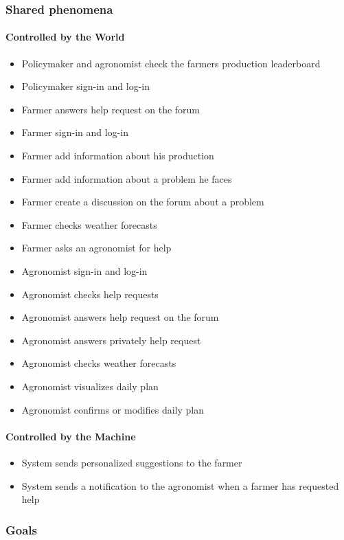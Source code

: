 \subsubsection{Shared phenomena}
\paragraph{Controlled by the World}
\begin{itemize}
    \item Policymaker and agronomist check the farmers production leaderboard
    \item Policymaker sign-in and log-in
    \item Farmer answers help request on the forum
    \item Farmer sign-in and log-in 
    \item Farmer add information about his production
    \item Farmer add information about a problem he faces
    \item Farmer create a discussion on the forum about a problem
    \item Farmer checks weather forecasts
    \item Farmer asks an agronomist for help
    \item Agronomist sign-in and log-in
    \item Agronomist checks help requests
    \item Agronomist answers help request on the forum
    \item Agronomist answers privately help request
    \item Agronomist checks weather forecasts
    \item Agronomist visualizes daily plan
    \item Agronomist confirms or modifies daily plan
\end{itemize}

\paragraph{Controlled by the Machine}
\begin{itemize}
    \item System sends personalized suggestions to the farmer
    \item System sends a notification to the agronomist when a farmer has requested help
\end{itemize}

\subsubsection{Goals}

